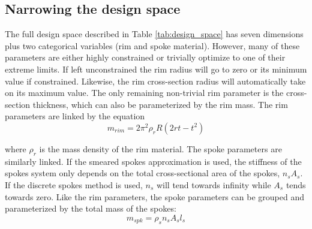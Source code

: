 \documentclass[\rootdir/thesis.tex]{subfiles}
\begin{document}
\subsection{Narrowing the design space}

The full design space described in Table \ref{tab:design_space} has seven dimensions plus two categorical variables (rim and spoke material). However, many of these parameters are either highly constrained or trivially optimize to one of their extreme limits. If left unconstrained the rim radius will go to zero or its minimum value if constrained. Likewise, the rim cross-section radius will automatically take on its maximum value. The only remaining non-trivial rim parameter is the cross-section thickness, which can also be parameterized by the rim mass. The rim parameters are linked by the equation
\begin{equation}
\label{eq:m_rim}
m_{rim} = 2\pi^2 \rho_r R (2rt - t^2)
\end{equation}

where $\rho_r$ is the mass density of the rim material. The spoke parameters are similarly linked. If the smeared spokes approximation is used, the stiffness of the spokes system only depends on the total cross-sectional area of the spokes, $n_sA_s$. If the discrete spokes method is used, $n_s$ will tend towards infinity while $A_s$ tends towards zero. Like the rim parameters, the spoke parameters can be grouped and parameterized by the total mass of the spokes:
\begin{equation}
\label{eq:m_spokes}
m_{spk} = \rho_s n_s A_s l_s
\end{equation}
\end{document}
